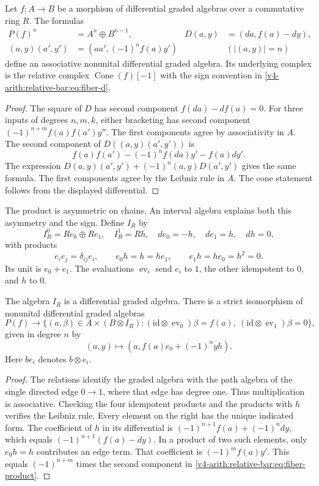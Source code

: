 \begin{theorem}\label{v4-arith:relative-bar:thm:fiber}
Let $f:A\to B$ be a morphism of differential graded algebras over a
commutative ring $R$. The formulas
\begin{align}
 P(f)^n&=A^n\oplus B^{n-1},&
 D(a,y)&=(da,f(a)-dy),\label{v4-arith:relative-bar:eq:fiber-d}\\
 (a,y)(a',y')&=(aa',(-1)^nf(a)y')&&(|(a,y)|=n)
 \label{v4-arith:relative-bar:eq:fiber-product}
\end{align}
define an associative nonunital differential graded algebra. Its
underlying complex is the relative complex $\operatorname{Cone}(f)[-1]$ with
the sign convention in \eqref{v4-arith:relative-bar:eq:fiber-d}.
\end{theorem}
\begin{proof}
The square of $D$ has second component $f(da)-df(a)=0$.
For three inputs of degrees $n,m,k$, either bracketing has second
component $(-1)^{n+m}f(a)f(a')y''$. The first components agree by
associativity in $A$. The second component of
$D((a,y)(a',y'))$ is
\[
 f(a)f(a')-(-1)^nf(da)y'-f(a)dy'.
\]
The expression $D(a,y)(a',y')+(-1)^n(a,y)D(a',y')$ gives the same
formula. The first components agree by the Leibniz rule in $A$.
The cone statement follows from the displayed differential.
\end{proof}

The product is asymmetric on chains. An interval algebra explains both
this asymmetry and the sign. Define $I_R$ by
\[
 I_R^0=Re_0\oplus Re_1,\quad I_R^1=Rh,\quad
 de_0=-h,\quad de_1=h,\quad dh=0,
\]
with products
\[
 e_ie_j=\delta_{ij}e_i,\qquad e_0h=h=he_1,
 \qquad e_1h=he_0=h^2=0.
\]
Its unit is $e_0+e_1$. The evaluations $\operatorname{ev}_i$ send
$e_i$ to $1$, the other idempotent to $0$, and $h$ to $0$.

\begin{proposition}\label{v4-arith:relative-bar:prop:interval}
The algebra $I_R$ is a differential graded algebra. There is a strict
isomorphism of nonunital differential graded algebras
\[
 P(f)\longrightarrow
 \{(a,\beta)\in A\times(B\otimes I_R):
 (\mathrm{id}\otimes\operatorname{ev}_0)\beta=f(a),\
 (\mathrm{id}\otimes\operatorname{ev}_1)\beta=0\},
\]
given in degree $n$ by
\[
 (a,y)\longmapsto(a,f(a)e_0+(-1)^nyh).
\]
Here $be_i$ denotes $b\otimes e_i$.
\end{proposition}
\begin{proof}
The relations identify the graded algebra with the path algebra of
the single directed edge $0\to1$, where that edge has degree one.
Thus multiplication is associative. Checking the four idempotent
products and the products with $h$ verifies the Leibniz rule.
Every element on the right has the unique indicated form.
The coefficient of $h$ in its differential is
$(-1)^{n+1}f(a)+(-1)^ndy$, which equals
$(-1)^{n+1}(f(a)-dy)$.
In a product of two such elements, only $e_0h=h$ contributes an
edge term. That coefficient is $(-1)^mf(a)y'$. This equals
$(-1)^{n+m}$ times the second component in
\eqref{v4-arith:relative-bar:eq:fiber-product}.
\end{proof}

